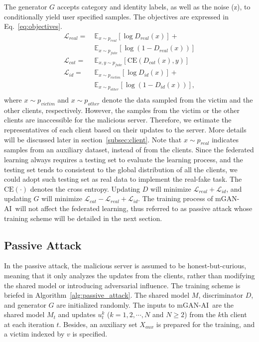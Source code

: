 \documentclass[10pt, conference, letterpaper]{IEEEtran}
\newcommand{\alg}{mGAN-AI}
\begin{document}
The generator $G$ accepts category and identity labels, as well as the noise (z), to conditionally yield user specified samples. The objectives are expressed in Eq.~\ref{eq:objectives}.
\begin{equation}
\begin{split}
\mathcal{L}_{real} = & \ \mathbb{E}_{x\sim p_{real}}[\log D_{real}(x)] + \\
~ & \ \mathbb{E}_{x\sim p_{fake}}[\log (1-D_{real}(x))]\\
\mathcal{L}_{cat} = & \
\mathbb{E}_{x,y\sim p_{fake}}[\text{CE}(D_{cat}(x), y)] \\
\mathcal{L}_{id} = & \ \mathbb{E}_{x\sim p_{victim}}[\log D_{id}(x)] + \\
~ & \ \mathbb{E}_{x\sim p_{other}}[\log (1-D_{id}(x))],\\
\end{split}
\label{eq:objectives}
\end{equation}
where $x \sim p_{victim}$ and $x \sim p_{other}$ denote the data sampled from the victim and the other clients, respectively. However, the samples from the victim or the other clients are inaccessible for the malicious server. Therefore, we estimate the representatives of each client based on their updates to the server. More details will be discussed later in section~\ref{subsec:client}. Note that $x\sim p_{real}$ indicates samples from an auxiliary dataset, instead of from the clients. Since the federated learning always requires a testing set to evaluate the learning process, and the testing set tends to consistent to the global distribution of all the clients, we could adopt such testing set as real data to implement the real-fake task. The $\text{CE}(\cdot)$ denotes the cross entropy. Updating $D$ will minimize $\mathcal{L}_{real} + \mathcal{L}_{id}$,
and updating $G$ will minimize $\mathcal{L}_{cat} - \mathcal{L}_{real} + \mathcal{L}_{id}$. The training process of \alg~will not affect the federated learning, thus referred to as passive attack whose training scheme will be detailed in the next section.

\subsection{Passive Attack}
\label{subsec:passive}
In the passive attack, the malicious server is assumed to be honest-but-curious, meaning that it only analyzes the updates from the clients, rather than modifying the shared model or introducing adversarial influence. The training scheme is briefed in Algorithm~\ref{alg:passive_attack}. The shared model $M$, discriminator $D$, and generator $G$ are initialized randomly. The inputs to \alg~are the shared model $M_t$ and updates $u_t^k$ ($k=1,2,\cdots,N$ and $N\ge 2$) from the $k$th client at each iteration $t$. Besides, an auxiliary set $X_{aux}$ is prepared for the training, and a victim indexed by $v$ is specified.
\end{document}
